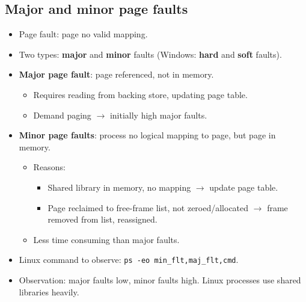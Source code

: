 \subsection{Major and minor page faults}
\begin{itemize}
    \item Page fault: page no valid mapping.
    \item Two types: \textbf{major} and \textbf{minor} faults (Windows: \textbf{hard} and \textbf{soft} faults).
    \item \textbf{Major page fault}: page referenced, not in memory.
    \begin{itemize}
        \item Requires reading from backing store, updating page table.
        \item Demand paging $\rightarrow$ initially high major faults.
    \end{itemize}
    \item \textbf{Minor page faults}: process no logical mapping to page, but page in memory.
    \begin{itemize}
        \item Reasons:
        \begin{itemize}
            \item Shared library in memory, no mapping $\rightarrow$ update page table.
            \item Page reclaimed to free-frame list, not zeroed/allocated $\rightarrow$ frame removed from list, reassigned.
        \end{itemize}
        \item Less time consuming than major faults.
    \end{itemize}
    \item Linux command to observe: \texttt{ps -eo min\_flt,maj\_flt,cmd}.
    \item Observation: major faults low, minor faults high. Linux processes use shared libraries heavily.
\end{itemize}

